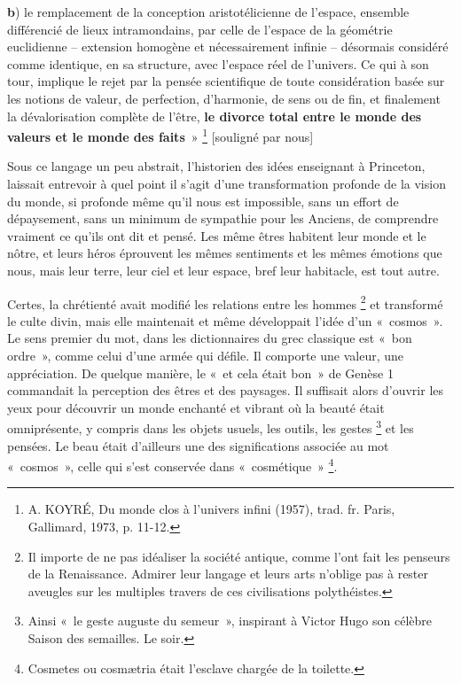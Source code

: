 \documentclass[a4paper,12pt]{article}
\begin{document}
\textbf{b}) le remplacement de la conception aristotélicienne de l'espace, ensemble différencié de lieux intramondains, par celle de l'espace de la géométrie euclidienne – extension homogène et nécessairement infinie  – désormais considéré comme identique, en sa structure, avec l'espace réel de l'univers. Ce qui à son tour, implique le rejet par la pensée scientifique de toute considération basée sur les notions de valeur, de perfection, d'harmonie, de sens ou de fin, et finalement la dévalorisation complète de l’être, \textbf{le divorce total entre le monde des valeurs et le monde des faits} » \footnote{A. KOYRÉ, Du monde clos à l’univers infini (1957), trad. fr. Paris, Gallimard, 1973, p. 11-12.} [souligné par nous]

Sous ce langage un peu abstrait, l’historien des idées enseignant à Princeton, laissait entrevoir à quel point il s'agit d'une transformation profonde de la vision du monde, si profonde même qu'il nous est impossible, sans un effort de dépaysement, sans un minimum de sympathie pour les Anciens, de comprendre vraiment ce qu'ils ont dit et pensé. Les même êtres habitent leur monde et le nôtre, et leurs héros éprouvent les mêmes sentiments et les mêmes émotions que nous, mais leur terre, leur ciel et leur espace, bref leur habitacle, est tout autre.

Certes, la chrétienté avait modifié les relations entre les hommes \footnote{Il importe de ne pas idéaliser la société antique, comme l’ont fait les penseurs de la Renaissance. Admirer leur langage et leurs arts n’oblige pas à rester aveugles sur les multiples travers de ces civilisations polythéistes.} et transformé le culte divin, mais elle maintenait et même développait l'idée d'un « cosmos ». 
Le sens premier du mot, dans les dictionnaires du grec classique est « bon ordre », comme celui d'une armée qui défile. Il comporte une valeur, une appréciation. De quelque manière, le « et cela était bon » de Genèse 1 commandait la perception des êtres et des paysages. Il suffisait alors d'ouvrir les yeux pour découvrir un monde enchanté et vibrant où la beauté était omniprésente, y compris dans les objets usuels, les outils, les gestes \footnote{Ainsi « le geste auguste du semeur », inspirant à Victor Hugo son célèbre Saison des semailles. Le soir.} et les pensées. Le beau était d'ailleurs une des significations associée au mot « cosmos », celle qui s’est conservée dans « cosmétique » \footnote{Cosmetes ou cosmætria était l’esclave chargée de la toilette.}. 
\end{document}
